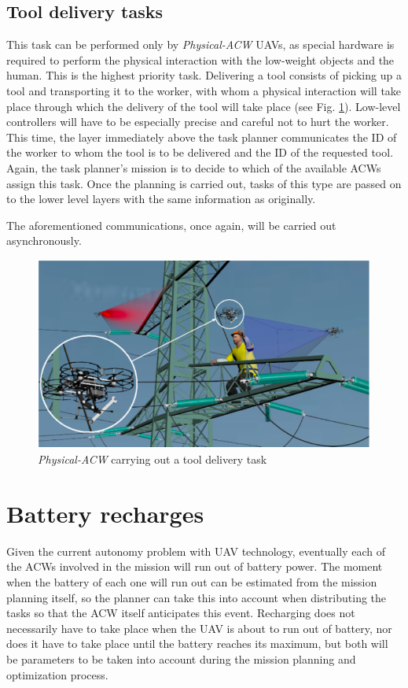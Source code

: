 \subsection{Tool delivery tasks}
\label{subsec:ToolDeliveryTasks}
This task can be performed only by \textit{Physical-ACW} \glspl{UAV}, as special hardware is required to perform the physical interaction with the low-weight objects and the human. This is the highest priority task. Delivering a tool consists of picking up a tool and transporting it to the worker, with whom a physical interaction will take place through which the delivery of the tool will take place (see Fig. \ref{fig:deliver_task}). Low-level controllers will have to be especially precise and careful not to hurt the worker. This time, the layer immediately above the task planner communicates the \gls{ID} of the worker to whom the tool is to be delivered and the \gls{ID} of the requested tool. Again, the task planner's mission is to decide to which of the available \glspl{ACW} assign this task. Once the planning is carried out, tasks of this type are passed on to the lower level layers with the same information as originally.

The aforementioned communications, once again, will be carried out asynchronously. 


\begin{figure}[htbp]
    \centering
    \includegraphics[width=0.7\linewidth]
    {ProblemFormulation/figures/deliver_task.png}
    \caption{\textit{Physical-ACW} carrying out a tool delivery task}
    \label{fig:deliver_task}
\end{figure}

\section{Battery recharges}
\label{sec:BatteryRecharges}
Given the current autonomy problem with \gls{UAV} technology, eventually each of the \glspl{ACW} involved in the mission will run out of battery power. The moment when the battery of each one will run out can be estimated from the mission planning itself, so the planner can take this into account when distributing the tasks so that the \gls{ACW} itself anticipates this event. Recharging does not necessarily have to take place when the \gls{UAV} is about to run out of battery, nor does it have to take place until the battery reaches its maximum, but both will be parameters to be taken into account during the mission planning and optimization process.

